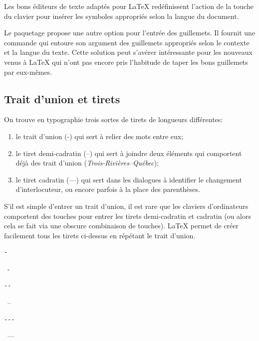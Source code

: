 Les bons éditeurs de texte adaptés pour {\LaTeX} redéfinissent
l'action de la touche \fbox{\texttt{\textquotedbl}} du clavier pour
insérer les symboles appropriés selon la langue du document.

Le paquetage  \citep{csquotes} propose une autre option
pour l'entrée des guillemets. Il fournit une commande
\cmdprint{\enquote} qui entoure son argument des guillemets appropriés
selon le contexte et la langue du texte. Cette solution peut s'avérer
intéressante pour les nouveaux venus à {\LaTeX} qui n'ont pas encore
pris l'habitude de taper les bons guillemets par eux-mêmes.

\subsection{Trait d'union et tirets}
\label{chap:bases:caracteres:tirets}

On trouve en typographie trois sortes de tirets de longueurs différentes:
\begin{enumerate}
\item le trait d'union (-) qui sert à relier des mots entre eux;
\item le tiret demi-cadratin (--) qui sert à joindre deux éléments qui
  comportent déjà des trait d'union (\emph{Trois-Rivières--Québec});
\item le tiret cadratin (---) qui sert dans les dialogues à identifier
  le changement d'interlocuteur, ou encore parfois à la place des
  parenthèses.
\end{enumerate}

S'il est simple d'entrer un trait d'union, il est rare que les
claviers d'ordinateurs comportent des touches pour entrer les tirets
demi-cadratin et cadratin (ou alors cela se fait via une obscure
combinaison de touches). {\LaTeX} permet de créer facilement tous les
tirets ci-dessus en répétant le trait d'union.
\begin{demo}
  \begin{minipage}{0.2\linewidth}
    \begin{texample}
\begin{lstlisting}
-
\end{lstlisting}
      \producing\ -
    \end{texample}
  \end{minipage}
  \hfill
  \begin{minipage}{0.2\linewidth}
    \begin{texample}
\begin{lstlisting}
--
\end{lstlisting}
      \producing\ --
    \end{texample}
  \end{minipage}
  \hfill
  \begin{minipage}{0.2\linewidth}
    \begin{texample}
\begin{lstlisting}
---
\end{lstlisting}
      \producing\ ---
    \end{texample}
  \end{minipage}
\end{demo}

